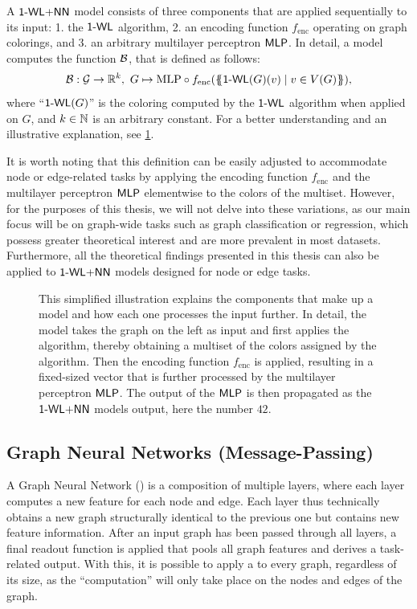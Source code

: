 \begin{definition}[$\wlnn$]
    A $\wlnn$ model consists of three components that are applied sequentially to its input: 1. the $\textsf{1-WL}$ algorithm, 2. an encoding function $f_\text{enc}$ operating on graph colorings, and 3. an arbitrary multilayer perceptron $\textsf{MLP}$. In detail, a \wlnn model computes the function $\mathcal{B}$, that is defined as follows:
    \begin{align*}
        \mathcal{B}: \mathcal{G} \rightarrow \mathbb{R}^k, \ G \mapsto \text{MLP} \circ f_{\text{enc}}(\{\!\!\{ \textsf{1-WL}(G)(v) \mid v \in V(G) \}\!\!\}),
    \end{align*}
    where ``$\textsf{1-WL}(G)$'' is the coloring computed by the $\textsf{1-WL}$ algorithm when applied on $G$, and $k \in \mathbb{N}$ is an arbitrary constant. For a better understanding and an illustrative explanation, see \cref{fig:wlnn}.
\end{definition}

It is worth noting that this definition can be easily adjusted to accommodate node or edge-related tasks by applying the encoding function $f_\text{enc}$ and the multilayer perceptron $\textsf{MLP}$ elementwise to the colors of the multiset. However, for the purposes of this thesis, we will not delve into these variations, as our main focus will be on graph-wide tasks such as graph classification or regression, which possess greater theoretical interest and are more prevalent in most datasets. Furthermore, all the theoretical findings presented in this thesis can also be applied to $\wlnn$ models designed for node or edge tasks.

\begin{figure}[!htb]
    \centering
    
    \caption{This simplified illustration explains the components that make up a \wlnn model and how each one processes the input further. In detail, the model takes the graph on the left as input and first applies the \wl algorithm, thereby obtaining a multiset of the colors assigned by the algorithm. Then the encoding function $f_\text{enc}$ is applied, resulting in a fixed-sized vector that is further processed by the multilayer perceptron $\textsf{MLP}$. The output of the $\textsf{MLP}$ is then propagated as the $\wlnn$ models output, here the number $42$.}
    \label{fig:wlnn}
\end{figure}

\subsection{Graph Neural Networks (Message-Passing)}\label{sec:GNN Defintion}
A \textsf{Graph Neural Network} (\gnn) is a composition of multiple layers, where each layer computes a new feature for each node and edge. Each \gnn layer thus technically obtains a new graph structurally identical to the previous one but contains new feature information. After an input graph has been passed through all layers, a final readout function is applied that pools all graph features and derives a task-related output. With this, it is possible to apply a \gnn to every graph, regardless of its size, as the ``computation'' will only take place on the nodes and edges of the graph. 

